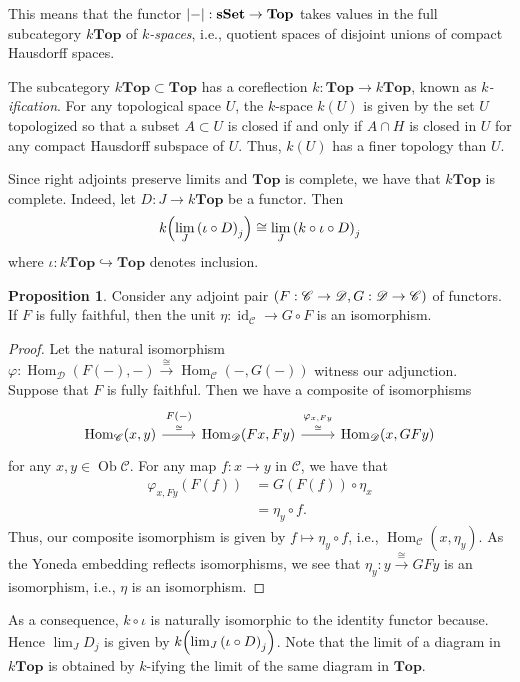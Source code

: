 \documentclass[10pt,letterpaper,cm]{nupset}
\theoremstyle{definition}
\theoremstyle{theorem}
\newtheorem{prop}[definition]{Proposition}
\theoremstyle{remark}
\DeclareMathOperator{\ob}{Ob}
\newcommand{\0}{\mathbf{0}}
\newcommand{\1}{\mathbf{1}}
\newcommand{\2}{\mathbf{2}}
\DeclareMathOperator{\sset}{\mathbf{sSet}}
\renewcommand{\c}{\mathscr{C}}
\renewcommand{\d}{\mathscr{D}}
\DeclareMathOperator{\Hom}{Hom}
\DeclareMathOperator{\idd}{id}
\begin{document}
This means that the functor $\mleft\lvert{-}\mright\rvert : \sset \to \mathbf{Top}$ takes values in the full subcategory $k\mathbf{Top}$ of \textit{$k$-spaces}, i.e., quotient spaces of disjoint unions of compact Hausdorff spaces.

\medskip

The subcategory $k\mathbf{Top}\subset \mathbf{Top}$ has a coreflection $k: \mathbf{Top} \to k\mathbf{Top}$, known as \textit{$k$-ification}. For any topological space $U$, the $k$-space $k(U)$ is given by the set $U$ topologized so that a subset $A\subset U$ is closed if and only if  $A \cap H$ is closed in $U$ for any compact Hausdorff subspace of $U$. Thus, $k(U)$ has a finer topology than $U$.

\medskip

Since right adjoints preserve limits and $\mathbf{Top}$ is complete, we have that $k\mathbf{Top}$ is complete. Indeed, let $D : J \to k\mathbf{Top}$ be a functor. Then
\[
k\mleft(\lim_J{\mleft(\iota \circ D\mright)_j}\mright) \cong \lim_J{\mleft(k\circ \iota \circ D\mright)_j}
\] where $\iota : k\mathbf{Top} \hookrightarrow \mathbf{Top}$ denotes inclusion.
\begin{prop}
Consider any adjoint pair $\mleft(F: \c \to \d, G: \d \to \c\mright)$ of functors. If $F$ is fully faithful, then the unit $\eta : \idd_{\c}\to  G\circ F $ is an isomorphism.
\end{prop}
\begin{proof}
Let the natural isomorphism $\varphi : \Hom_{\d}(F({-}), {-}) \overset{\cong}{\longrightarrow} \Hom_{\c}({-}, G({-}))$ witness our adjunction. Suppose that $F$ is fully faithful. Then we have a composite of isomorphisms
\[
\begin{tikzcd}
{\Hom_{\c}(x,y)} \arrow[r, "\underset{\cong}{F({-})}"] & {\Hom_{\d}(F{x}, F{y})} \arrow[r, "\underset{\cong}{\varphi_{x, F{y}}}"] & {\Hom_{\d}(x, G{F{y}})}
\end{tikzcd}
\] for any $x,y\in \ob{\c}$. For any map $f: x\to y$ in $\c$, we have that 
\begin{align*}
 \varphi_{x,F{y}}(F(f)) & =G(F(f)) \circ \eta_x \tag{unit identity}
 \\ & = \eta_y \circ f \tag{naturality of $\eta$}.
 \end{align*} Thus, our composite isomorphism is given by $f\mapsto \eta_y \circ f$, i.e., $\Hom_{\c}(x, \eta_y)$. As the Yoneda embedding reflects isomorphisms, we see that $\eta_y : y \overset{\cong}{\longrightarrow} G{F{y}}$ is an isomorphism, i.e., $\eta$ is an isomorphism.
\end{proof}
As a consequence, $k\circ \iota$ is naturally isomorphic to the identity functor because. Hence $\lim_J{D_j}$ is given by $k\mleft(\lim_J{\mleft(\iota \circ D\mright)_j}\mright)$. Note that the limit of a diagram in $k\mathbf{Top}$ is obtained by $k$-ifying the limit of the same diagram in $\mathbf{Top}$. 
\end{document}
